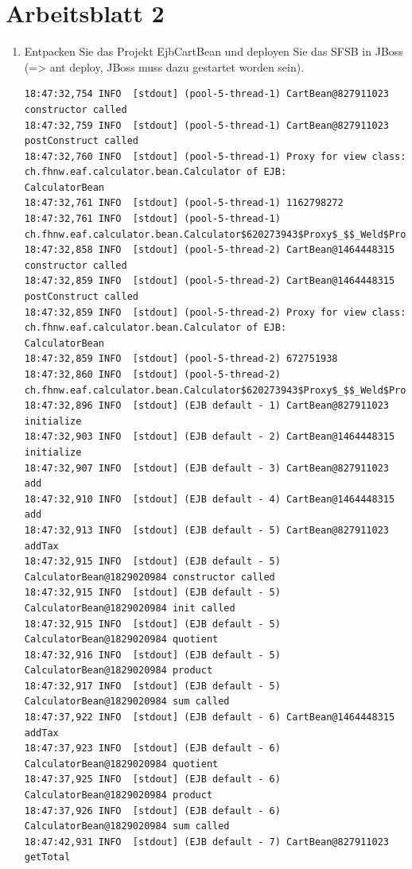 \documentclass[a4paper,10pt]{scrreprt}
\begin{document}
\chapter{Arbeitsblatt 2}
\begin{enumerate}
 \item Entpacken Sie das Projekt EjbCartBean und deployen Sie das SFSB in JBoss (=> ant deploy,
JBoss muss dazu gestartet worden sein).

\begin{lstlisting}[language={}]
 18:47:32,754 INFO  [stdout] (pool-5-thread-1) CartBean@827911023 constructor called
18:47:32,759 INFO  [stdout] (pool-5-thread-1) CartBean@827911023 postConstruct called
18:47:32,760 INFO  [stdout] (pool-5-thread-1) Proxy for view class: ch.fhnw.eaf.calculator.bean.Calculator of EJB: 
CalculatorBean
18:47:32,761 INFO  [stdout] (pool-5-thread-1) 1162798272
18:47:32,761 INFO  [stdout] (pool-5-thread-1) ch.fhnw.eaf.calculator.bean.Calculator$620273943$Proxy$_$$_Weld$Proxy$
18:47:32,858 INFO  [stdout] (pool-5-thread-2) CartBean@1464448315 constructor called
18:47:32,859 INFO  [stdout] (pool-5-thread-2) CartBean@1464448315 postConstruct called
18:47:32,859 INFO  [stdout] (pool-5-thread-2) Proxy for view class: ch.fhnw.eaf.calculator.bean.Calculator of EJB: 
CalculatorBean
18:47:32,859 INFO  [stdout] (pool-5-thread-2) 672751938
18:47:32,860 INFO  [stdout] (pool-5-thread-2) ch.fhnw.eaf.calculator.bean.Calculator$620273943$Proxy$_$$_Weld$Proxy$
18:47:32,896 INFO  [stdout] (EJB default - 1) CartBean@827911023 initialize
18:47:32,903 INFO  [stdout] (EJB default - 2) CartBean@1464448315 initialize
18:47:32,907 INFO  [stdout] (EJB default - 3) CartBean@827911023 add
18:47:32,910 INFO  [stdout] (EJB default - 4) CartBean@1464448315 add
18:47:32,913 INFO  [stdout] (EJB default - 5) CartBean@827911023 addTax
18:47:32,915 INFO  [stdout] (EJB default - 5) CalculatorBean@1829020984 constructor called
18:47:32,915 INFO  [stdout] (EJB default - 5) CalculatorBean@1829020984 init called
18:47:32,915 INFO  [stdout] (EJB default - 5) CalculatorBean@1829020984 quotient
18:47:32,916 INFO  [stdout] (EJB default - 5) CalculatorBean@1829020984 product
18:47:32,917 INFO  [stdout] (EJB default - 5) CalculatorBean@1829020984 sum called
18:47:37,922 INFO  [stdout] (EJB default - 6) CartBean@1464448315 addTax
18:47:37,923 INFO  [stdout] (EJB default - 6) CalculatorBean@1829020984 quotient
18:47:37,925 INFO  [stdout] (EJB default - 6) CalculatorBean@1829020984 product
18:47:37,926 INFO  [stdout] (EJB default - 6) CalculatorBean@1829020984 sum called
18:47:42,931 INFO  [stdout] (EJB default - 7) CartBean@827911023 getTotal

\end{lstlisting}
\end{enumerate}
\end{document}

